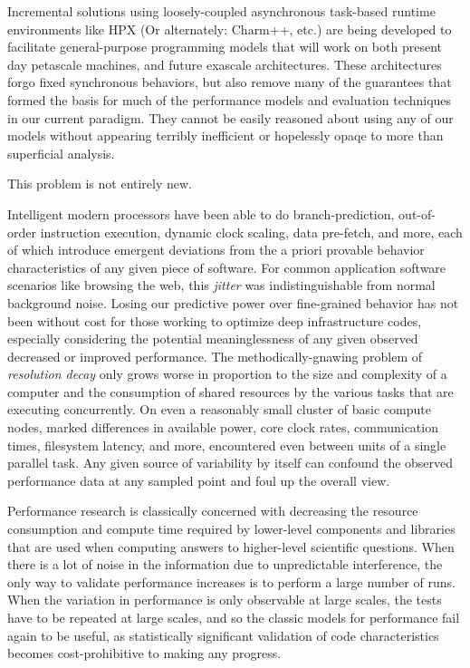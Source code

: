 Incremental solutions using loosely-coupled asynchronous task-based
runtime environments \cite{kaiser2014hpx} like HPX (Or alternately:
Charm++, etc.) are being developed to facilitate general-purpose
programming models that will work on both present day petascale
machines, and future exascale architectures.
%
These architectures forgo fixed synchronous behaviors, but also remove
many of the guarantees that formed the basis for much of the
performance models and evaluation techniques in our current paradigm.
%
They cannot be easily reasoned about using any of our models without
appearing terribly inefficient or hopelessly opaqe to more than
superficial analysis.

This problem is not entirely new.

Intelligent modern processors have been able to do branch-prediction,
out-of-order instruction execution, dynamic clock scaling, data
pre-fetch, and more, each of which introduce emergent deviations from
the a priori provable behavior characteristics of any given piece of
software.
%
For common application software scenarios like browsing the web, this
\textit{jitter} was indistinguishable from normal background
noise.
%
Losing our predictive power over fine-grained behavior has not been
without cost for those working to optimize deep infrastructure codes,
especially considering the potential meaninglessness of any given
observed decreased or improved performance.
%
The methodically-gnawing problem of \textit{resolution decay} only
grows worse in proportion to the size and complexity of a computer and
the consumption of shared resources by the various tasks that are
executing concurrently.
%
On even a reasonably small cluster of basic compute nodes, marked
differences in available power, core clock rates, communication times,
filesystem latency, and more, encountered even between units of a
single parallel task.
%
Any given source of variability by itself can confound the observed
performance data at any sampled point and foul up the overall view.

Performance research is classically concerned with decreasing the
resource consumption and compute time required by lower-level
components and libraries that are used when computing answers to
higher-level scientific questions.
%
When there is a lot of noise in the information due to unpredictable
interference, the only way to validate performance increases is to
perform a large number of runs.
%
When the variation in performance is only observable at large scales,
the tests have to be repeated at large scales, and so the classic
models for performance fail again to be useful, as statistically
significant validation of code characteristics becomes
cost-prohibitive to making any progress.

